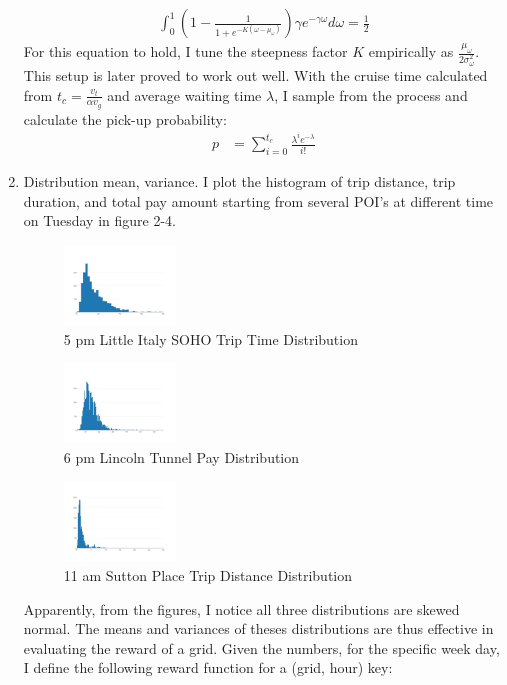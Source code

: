 \documentclass[letterpaper, 10 pt, conference]{ieeeconf}
\begin{document}
\begin{enumerate}
\begin{align}
\int_{0}^{1}(1-\frac{1}{1+e^{-K(\omega-\mu_\omega)}})\gamma e^{-\gamma\omega}d\omega = \frac{1}{2}
\end{align}
For this equation to hold, I tune the steepness factor $K$ empirically as $\frac{\mu_\omega}{2\sigma_\omega^2}$. This setup is later proved to work out well.
With the cruise time calculated from $t_c = \frac{v_t}{\alpha v_g}$ and average waiting time $\lambda$, I sample from the process and calculate the pick-up probability:
\begin{align}
p &= \sum_{i=0}^{t_c}\frac{\lambda^ie^{-\lambda}}{i!}
\end{align}
\item Distribution mean, variance. I plot the histogram of trip distance, trip duration, and total pay amount starting from several POI's at different time on Tuesday in figure 2-4.
\begin{figure}
\centering
\includegraphics[width=0.28\textwidth]{5pm-littleitaly-soho-triptime.jpeg}
\caption{5 pm Little Italy SOHO Trip Time Distribution}
\end{figure}
\begin{figure}
\centering
\includegraphics[width=0.28\textwidth]{18-lincoln-tunnel-pay.jpeg}
\caption{6 pm Lincoln Tunnel Pay Distribution}
\end{figure}
\begin{figure}
\centering
\includegraphics[width=0.28\textwidth]{11am-sutton-place-dist.jpeg}
\caption{11 am Sutton Place Trip Distance Distribution}
\end{figure}
Apparently, from the figures, I notice all three distributions are skewed normal. The means and variances of theses distributions are thus effective in evaluating the reward of a grid. Given the numbers, for the specific week day, I define the following reward function for a (grid, hour) key:

\end{enumerate}
\end{document}
